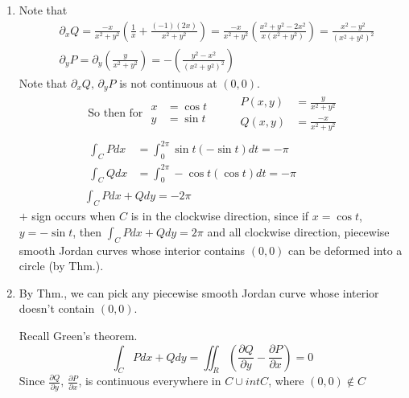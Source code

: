 \documentclass[twoside]{amsart}
\theoremstyle{plain}
\theoremstyle{definition}
\newcommand{\exercisehead}[1]
  {
   \noindent{\small\bf Exercise #1.}
   \smallskip}
\begin{document}
\exercisehead{1}
\begin{enumerate}
\item  Note that 
\[
\begin{aligned}
  & \partial_x Q = \frac{ -x }{ x^2 + y^2 } \left( \frac{1}{x} + \frac{ (-1)(2x) }{ x^2 + y^2 } \right) = \frac{-x}{ x^2 + y^2 } \left( \frac{ x^2  +y^2 - 2x^2 }{ x(x^2 + y^2 )} \right) = \frac{ x^2 - y^2 }{ (x^2 + y^2)^2 } \\
  &  \partial_y P = \partial_y \left( \frac{y}{ x^2 + y^2 } \right) = - \left( \frac{ y^2 - x^2 }{ (x^2 + y^2)^2 } \right)
\end{aligned}
\]
Note that $\partial_x Q, \, \partial_y P$ is not continuous at $(0,0)$.  
\[
\begin{gathered}
  \text{ So then for } \begin{aligned} x &= \cos{t} \\ y & = \sin{t} \end{aligned} \quad \quad \, \begin{aligned} P(x,y) & = \frac{y}{ x^2 + y^2 } \\ Q(x,y) & = \frac{-x}{x^2 + y^2 } \end{aligned}  \\
  \begin{aligned}
    \int_C P dx & = \int_0^{2\pi} \sin{t} (-\sin{t}) dt = -\pi \\
    \int_C Q dx & = \int_0^{2\pi} -\cos{t} (\cos{t}) dt = - \pi 
\end{aligned} \\
  \int_C P dx + Q dy = - 2\pi 
\end{gathered}
\]
$+$ sign occurs when $C$ is in the clockwise direction, since if $x= \cos{t}$, $y= -\sin{t}$, then $\int_C P dx + Q dy = 2\pi$ and all clockwise direction, piecewise smooth Jordan curves whose interior contains $(0,0)$ can be deformed into a circle (by Thm.).
\item By Thm., we can pick any piecewise smooth Jordan curve whose interior doesn't contain $(0,0)$.  

Recall Green's theorem.  
\[
\int_C P dx + Q dy = \iint_R \left( \frac{ \partial Q }{ \partial y} - \frac{ \partial P }{ \partial x } \right) = 0 
\]
Since $\frac{ \partial Q}{ \partial y}, \, \frac{ \partial P}{ \partial x }$, is continuous everywhere in $C \cup int{C}$, where $(0,0) \notin C$
\end{enumerate}
\end{document}
